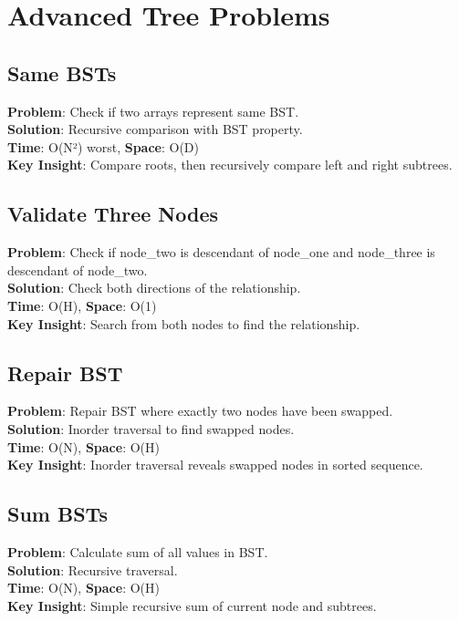 \documentclass{report}
\begin{document}
\section{Advanced Tree Problems}

\subsection{Same BSTs}
\textbf{Problem}: Check if two arrays represent same BST.\\
\textbf{Solution}: Recursive comparison with BST property.\\
\textbf{Time}: O(N²) worst, \textbf{Space}: O(D)\\
\textbf{Key Insight}: Compare roots, then recursively compare left and right subtrees.

\subsection{Validate Three Nodes}
\textbf{Problem}: Check if node\_two is descendant of node\_one and node\_three is descendant of node\_two.\\
\textbf{Solution}: Check both directions of the relationship.\\
\textbf{Time}: O(H), \textbf{Space}: O(1)\\
\textbf{Key Insight}: Search from both nodes to find the relationship.

\subsection{Repair BST}
\textbf{Problem}: Repair BST where exactly two nodes have been swapped.\\
\textbf{Solution}: Inorder traversal to find swapped nodes.\\
\textbf{Time}: O(N), \textbf{Space}: O(H)\\
\textbf{Key Insight}: Inorder traversal reveals swapped nodes in sorted sequence.

\subsection{Sum BSTs}
\textbf{Problem}: Calculate sum of all values in BST.\\
\textbf{Solution}: Recursive traversal.\\
\textbf{Time}: O(N), \textbf{Space}: O(H)\\
\textbf{Key Insight}: Simple recursive sum of current node and subtrees.
\end{document}
